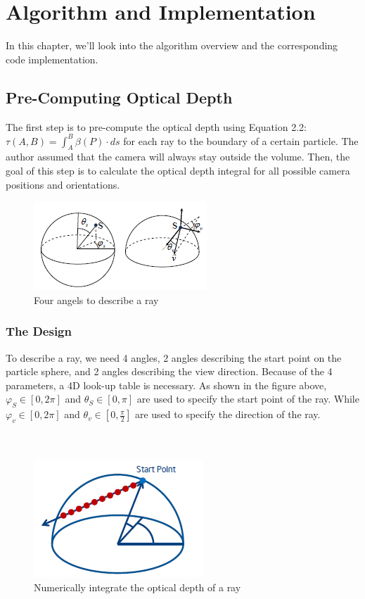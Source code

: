 \chapter{Algorithm and Implementation}
In this chapter, we'll look into the algorithm overview and the corresponding code implementation.

\section{Pre-Computing Optical Depth}
The first step is to pre-compute the optical depth using Equation 2.2: $\tau(A, B) = \int_{A}^{B}\beta(P)\cdot ds$ for each ray to the boundary of a certain particle. The author assumed that the camera will always stay outside the volume. Then, the goal of this step is to calculate the optical depth integral for all possible camera positions and orientations.

\begin{figure}[htp]
\begin{center}
\includegraphics[scale=1.0]{images/startandview.png}
\caption{Four angels to describe a ray}
\label{f8}
\end{center}
\end{figure}

\subsection{The Design}
To describe a ray, we need 4 angles, 2 angles describing the start point on the particle sphere, and 2 angles describing the view direction. Because of the 4 parameters, a 4D look-up table is necessary. As shown in the figure above, $\varphi_S\in[0, 2\pi]$ and $\theta_S\in[0, \pi]$ are used to specify the start point of the ray. While $\varphi_v\in[0, 2\pi]$ and $\theta_v\in[0, \frac{\pi}{2}]$ are used to specify the direction of the ray.\\\\\\

\begin{figure}[htp]
\begin{center}
\includegraphics[scale=1.0]{images/opticaldepthintegration.png}
\caption{Numerically integrate the optical depth of a ray}
\label{f9}
\end{center}
\end{figure}

